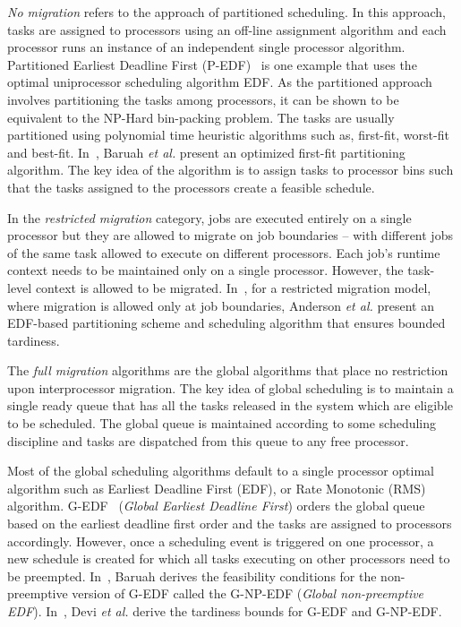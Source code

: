\documentclass[12pt,dvips]{report}
\begin{document}
\textit{No migration} refers to the approach of partitioned scheduling. In this approach, tasks are assigned to processors using an off-line assignment algorithm and each processor runs an instance of an independent single processor algorithm. Partitioned Earliest Deadline First (P-EDF)~\cite{anderson_pedf} is one example that uses the optimal uniprocessor scheduling algorithm EDF. As the partitioned approach involves partitioning the tasks among processors, it can be shown to be equivalent to the NP-Hard bin-packing problem. The tasks are usually partitioned using polynomial time heuristic algorithms such as, first-fit, worst-fit and best-fit. In~\cite{baruah-part-06}, Baruah \textit{et al.} present an optimized first-fit partitioning algorithm. The key idea of the algorithm is to assign tasks to processor bins such that the tasks assigned to the processors create a feasible schedule. %

In the \textit{restricted migration} category, jobs are executed entirely on a single processor but they are allowed to migrate on job boundaries -- with different jobs of the same task allowed to execute on different processors. Each job's runtime context needs to be maintained only on a single processor. However, the task-level context is allowed to be migrated. In~\cite{anderson_pedf}, for a restricted migration model, where migration is allowed only at job boundaries, Anderson \textit{et al.} present an EDF-based partitioning scheme and scheduling algorithm that ensures bounded tardiness.

The \textit{full migration} algorithms are the global algorithms that place no restriction upon interprocessor migration. The key idea of global scheduling is to maintain a single ready queue that has all the tasks released in the system which are eligible to be scheduled. The global queue is maintained according to some scheduling discipline and tasks are dispatched from this queue to any free processor. 

Most of the global scheduling algorithms default to a single processor optimal algorithm such as Earliest Deadline First (EDF), or Rate Monotonic (RMS) algorithm. G-EDF~\cite{GEDF} (\textit{Global Earliest Deadline First}) orders the global queue based on the earliest deadline first order and the tasks are assigned to processors accordingly. However, once a scheduling event is triggered on one processor, a new schedule is created for which all tasks executing on other processors need to be preempted. In~\cite{Baruah-gnpedf}, Baruah derives the feasibility conditions for the non-preemptive version of G-EDF called the G-NP-EDF (\textit{Global non-preemptive EDF}). In~\cite{devi_tardiness}, Devi \textit{et al.} derive the tardiness bounds for G-EDF and G-NP-EDF.
\end{document}
